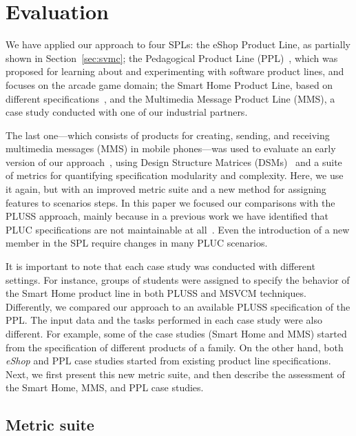 \section{Evaluation}
\label{sec:evaluation}

We have applied our approach to four SPLs: the eShop Product Line, as partially
shown  in Section~\ref{sec:svmc}; the Pedagogical Product Line
(PPL)~\cite{PPL:2008}, which was proposed for learning about and experimenting
with software product lines, and focuses on the arcade game domain; the Smart
Home Product Line, based on different
specifications~\cite{Pohl:2005aa,Alferez:2008aa}, and the Multimedia Message
Product Line (MMS), a case study conducted with one of our industrial partners.

The last one---which consists of products for creating, sending, and receiving
multimedia messages (MMS) in mobile phones---was used to evaluate an early
version of our approach~\cite{Bonifacio:2008aa}, using Design Structure Matrices
(DSMs)~\cite{Baldwin:2000aa,Lopes:2006aa} and a suite of metrics for quantifying
specification modularity and complexity. Here, we use it again, but with an
improved metric suite and a new method for assigning features to scenarios steps.
{\color{red}In this paper we focused our comparisons with
the PLUSS approach, mainly because in a previous work we have identified that PLUC specifications are not maintainable at all~\cite{Bonifacio:2008aa}. Even the introduction of a new member in the SPL require changes in many PLUC scenarios.} 

It is important to note that each case study was conducted with different
settings. For instance, groups of students were assigned to specify the behavior
of the Smart Home product line in both PLUSS and MSVCM techniques. Differently, we
compared our approach to an available PLUSS specification of the PPL. The input
data and the tasks performed in each case study were also different. For example,
some of the case studies (Smart Home and MMS) started from the specification of
different products of a family. On the other hand, both \emph{eShop} and PPL case
studies started from existing product line specifications. Next, we first present this new metric suite,
and then describe the assessment of the Smart Home, MMS, and PPL case studies. 


\subsection{Metric suite}\label{sub:metric-suite}


